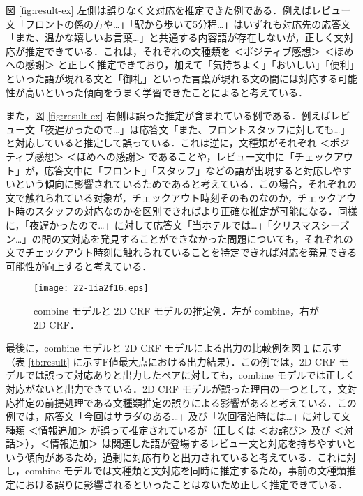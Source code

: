 \documentclass[japanese]{jnlp_1.4}
\begin{document}
図 \ref{fig:result-ex} 左側は誤りなく文対応を推定できた例である．例えばレビュー文「フロントの係の方や…」「駅から歩いて5分程…」はいずれも対応先の応答文「また、温かな嬉しいお言葉…」と共通する内容語が存在しないが，正しく文対応が推定できている．これは，それぞれの文種類を ＜ポジティブ感想＞ ＜ほめへの感謝＞ と正しく推定できており，加えて「気持ちよく」「おいしい」「便利」といった語が現れる文と「御礼」といった言葉が現れる文の間には対応する可能性が高いといった傾向をうまく学習できたことによると考えている．

また，図 \ref{fig:result-ex} 右側は誤った推定が含まれている例である．例えばレビュー文「夜遅かったので…」は応答文「また、フロントスタッフに対しても…」と対応していると推定して誤っている．これは逆に，文種類がそれぞれ ＜ポジティブ感想＞ ＜ほめへの感謝＞ であることや，レビュー文中に「チェックアウト」が，応答文中に「フロント」「スタッフ」などの語が出現すると対応しやすいという傾向に影響されているためであると考えている．この場合，それぞれの文で触れられている対象が，チェックアウト時刻そのものなのか，チェックアウト時のスタッフの対応なのかを区別できればより正確な推定が可能になる．同様に，「夜遅かったので…」に対して応答文「当ホテルでは…」「クリスマスシーズン…」の間の文対応を発見することができなかった問題についても，それぞれの文でチェックアウト時刻に触れられていることを特定できれば対応を発見できる可能性が向上すると考えている．

\begin{figure}[b]
\begin{center}
\texttt{[image: 22-1ia2f16.eps]}
\end{center}
\caption{combine モデルと 2D CRF モデルの推定例．左が combine，右が 2D CRF．}
\label{fig:result-ex-comparison}
\end{figure}

最後に，combine モデルと 2D CRF モデルによる出力の比較例を図 \ref{fig:result-ex-comparison} に示す（表 \ref{tb:result} に示すF値最大点における出力結果）．この例では，2D CRF モデルでは誤って対応ありと出力したペアに対しても，combine モデルでは正しく対応がないと出力できている．2D CRF モデルが誤った理由の一つとして，文対応推定の前提処理である文種類推定の誤りによる影響があると考えている．この例では，応答文「今回はサラダのある…」及び「次回宿泊時には…」に対して文種類 ＜情報追加＞ が誤って推定されているが（正しくは ＜お詫び＞ 及び ＜対話＞），\mbox{＜情}報追加＞ は関連した語が登場するレビュー文と対応を持ちやすいという傾向があるため，過剰に対応有りと出力されていると考えている．これに対し，combine モデルでは文種類と文対応を同時に推定するため，事前の文種類推定における誤りに影響されるといったことはないため正しく推定できている．
\end{document}
